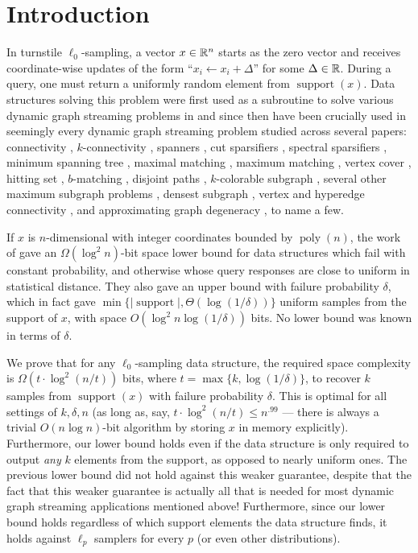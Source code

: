 \section{Introduction}
In turnstile $\ell_0$-sampling, a vector $x\in\mathbb{R}^n$ starts as the zero vector and receives coordinate-wise updates of the form ``$x_i \leftarrow x_i + \Delta$'' for some $\Delta\in\mathbb{R}$. During a query, one must return a uniformly random element from $\mathop{support}(x)$. Data structures solving this problem were first used as a subroutine to solve various dynamic graph streaming problems in \cite{AhnGM12a} and since then have been crucially used in seemingly every dynamic graph streaming problem studied across several papers: connectivity \cite{AhnGM12a}, $k$-connectivity \cite{AhnGM12a}, spanners \cite{AhnGM12b}, cut sparsifiers \cite{AhnGM12b}, spectral sparsifiers \cite{AhnGM13}, minimum spanning tree \cite{AhnGM12a}, maximal matching \cite{ChitnisCHM15}, maximum matching \cite{BuryS15,Konrad15,AssadiKLY16,ChitnisCEHMMV16,AssadiKL17}, vertex cover \cite{ChitnisCHM15,ChitnisCEHMMV16}, hitting set \cite{ChitnisCEHMMV16}, $b$-matching \cite{ChitnisCEHMMV16}, disjoint paths \cite{ChitnisCEHMMV16}, $k$-colorable subgraph \cite{ChitnisCEHMMV16}, several other maximum subgraph problems \cite{ChitnisCEHMMV16}, densest subgraph \cite{BhattacharyaHNT15,McGregorTVV15,EsfandiariHW16}, vertex and hyperedge connectivity \cite{GuhaMT15}, and approximating graph degeneracy \cite{FarachColtonT16}, to name a few.

If $x$ is $n$-dimensional with integer coordinates bounded by $\mathop{poly}(n)$, the work of \cite{JowhariST11} gave an $\Omega(\log^2 n)$-bit space lower bound for data structures which fail with constant probability, and otherwise whose query responses are close to uniform in statistical distance. They also gave an upper bound with failure probability $\delta$, which in fact gave $\min\{|\mathop{support{(x)}}|, \Theta(\log(1/\delta))\}$ uniform samples from the support of $x$, with space $O(\log^2 n \log(1/\delta))$ bits. No lower bound was known in terms of $\delta$.

We prove that for any $\ell_0$-sampling data structure, the required space complexity is $\Omega(t\cdot \log^2(n/t))$ bits, where $t = \max\{k, \log(1/\delta)\}$, to recover $k$ samples from $\mathop{support}(x)$ with failure probability $\delta$. This is optimal for all settings of $k, \delta, n$ (as long as, say, $t\cdot \log^2(n/t)\le n^{.99}$ --- there is always a trivial $O(n \log n)$-bit algorithm by storing $x$ in memory explicitly). Furthermore, our lower bound holds even if the data structure is only required to output {\em any} $k$ elements from the support, as opposed to nearly uniform ones. The previous lower bound did not hold against this weaker guarantee, despite that the fact that this weaker guarantee is actually all that is needed for most dynamic graph streaming applications mentioned above! Furthermore, since our lower bound holds regardless of which support elements the data structure finds, it holds against $\ell_p$ samplers for every $p$ (or even other distributions).


